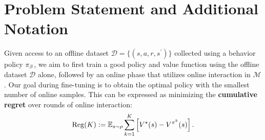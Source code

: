 \vspace{-0.2cm}
\section{Problem Statement and Additional Notation}
\vspace{-0.2cm}

Given access to an offline dataset $\mathcal{D} = \{(s, a, r, s^\prime)\}$ collected using a behavior policy ${\pi_\beta}$, we aim to first train a good policy and value function using the offline dataset $\mathcal{D}$ alone, followed by an online phase that utilizes online interaction in $\mathcal{M}$. Our goal during fine-tuning is to obtain the optimal policy with the smallest number of online samples. This can be expressed as minimizing the \textbf{cumulative regret} over rounds of online interaction: 
\begin{align}
\mathrm{Reg}(K) := \mathbb E_{s\sim \rho}\sum_{k=1}^K\left[ V^{\star}(s) - V^{\pi^k}(s) \right]. 
\end{align}

